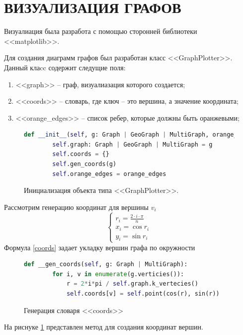 \section{ВИЗУАЛИЗАЦИЯ ГРАФОВ}
Визуалиация была разработа с помощью
сторонней библиотеки <<matplotlib>>.

Для создания диаграмм графов был разработан класс
<<GraphPlotter>>. Данный клаcc содержит следущие поля:
\begin{enumerate}
    \item  <<graph>> -- граф, визуалиазация которого создается;
    \item <<coords>> -- словарь, где ключ -- это вершина, а значение
        координата;
    \item <<orange\_edges>> -- список ребер, которые 
        должны быть оранжевыми;
\end{enumerate}
\begin{figure}[H] 
\begin{lstlisting}[language=Python] 
    def __init__(self, g: Graph | GeoGraph | MultiGraph, orange_edges=[]):
        self.graph: Graph | GeoGraph | MultiGraph = g
        self.coords = {}
        self.gen_coords(g)
        self.orange_edges = orange_edges
\end{lstlisting}  
    \caption{Инициализация объекта типа <<GraphPlotter>>.}
\end{figure} 
Рассмотрим генерацию координат для 
вершины $v_{i}$
\begin{equation}
\begin{cases}
    r_{i} = \frac{2 \cdot i \cdot \pi }{n} \\
    x_{i} =  \cos{r_{i}}\\
    y_{i} = \sin{r_{i}}
\end{cases}
\label{coords}
\end{equation} 
Формула \ref{coords} задает укладку
вершин графа по окружности
\begin{figure}[H] 
\begin{lstlisting}[language=Python] 
    def __gen_coords(self, g: Graph | MultiGraph):
        for i, v in enumerate(g.verticies()):
            r = 2*i*pi / self.graph.k_vertecies()
            self.coords[v] = self.point(cos(r), sin(r))
\end{lstlisting}  
    \caption{Генерация словаря <<coords>>}
    \label{gcoors}
\end{figure} 
На риснуке \ref{gcoors} представлен метод для создания
координат вершин.

